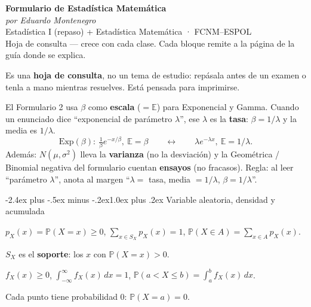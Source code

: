 \documentclass[10pt,a4paper]{article}
\makeatletter
\newcommand{\E}{\mathbb{E}}
\newcommand{\Prob}{\mathbb{P}}
\renewcommand\section{\@startsection{section}{1}{0pt}%
  {-2.4ex plus -.5ex minus -.2ex}{1.0ex plus .2ex}%
  {\normalfont\large\bfseries\color{seccolor}}}
\makeatother
\begin{document}
\begin{center}
  {\LARGE\bfseries Formulario de Estadística Matemática}\\[2pt]
  {\small\itshape por Eduardo Montenegro}\\[3pt]
  {\large Estadística I (repaso) + Estadística Matemática · FCNM–ESPOL}\\[3pt]
  {\small Hoja de consulta — crece con cada clase. Cada bloque remite a la página
  de la guía donde se explica.}
\end{center}

\vspace{-2pt}
\begin{notebox}[frametitle={Cómo usar este formulario}]
Es una \textbf{hoja de consulta}, no un tema de estudio: repásala antes de un
examen o tenla a mano mientras resuelves. Está pensada para imprimirse.
\end{notebox}

\begin{warnbox}[frametitle={Antes de empezar: parametrizaciones (fuente nº 1 de errores)}]
El Formulario 2 usa $\beta$ como \textbf{escala} ($=\E$) para Exponencial y
Gamma. Cuando un enunciado dice ``exponencial de parámetro $\lambda$'', ese
$\lambda$ es la \textbf{tasa}: $\beta=1/\lambda$ y la media es $1/\lambda$.
\[
\text{Exp}(\beta):\ \tfrac1\beta e^{-x/\beta},\ \E=\beta
\qquad\longleftrightarrow\qquad
\lambda e^{-\lambda x},\ \E=1/\lambda .
\]
Además: $N(\mu,\sigma^2)$ lleva la \textbf{varianza} (no la desviación) y la
Geométrica / Binomial negativa del formulario cuentan \textbf{ensayos} (no
fracasos). Regla: al leer ``parámetro $\lambda$'', anota al margen
``$\lambda=$ tasa, media $=1/\lambda$, $\beta=1/\lambda$''.
\end{warnbox}

\section{Variable aleatoria, densidad y acumulada}

\begin{defbox}[frametitle={Discreta: función de probabilidad}]
$p_X(x)=\Prob(X=x)\ge 0$, \quad
$\displaystyle\sum_{x\in S_X}p_X(x)=1$, \quad
$\Prob(X\in A)=\displaystyle\sum_{x\in A}p_X(x)$.

\smallskip
$S_X$ es el \textbf{soporte}: los $x$ con $\Prob(X=x)>0$.
\end{defbox}

\begin{defbox}[frametitle={Continua: función de densidad (fdp)}]
$f_X(x)\ge 0$, \quad
$\displaystyle\int_{-\infty}^{\infty}f_X(x)\,dx=1$, \quad
$\Prob(a<X\le b)=\displaystyle\int_a^b f_X(x)\,dx$.

\smallskip
Cada punto tiene probabilidad $0$: $\Prob(X=a)=0$.
\end{defbox}
\end{document}
